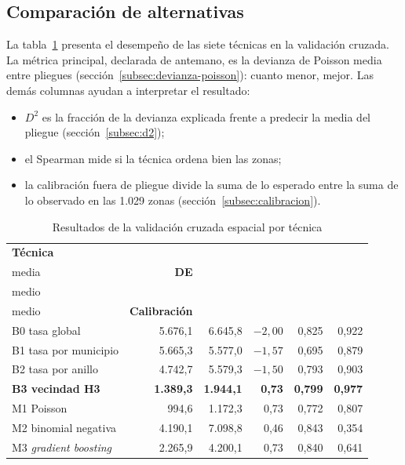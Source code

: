 \subsection{Comparación de alternativas}
\label{sec:comparacion-alternativas}

La tabla~\ref{tab:cv-resumen} presenta el desempeño de las siete técnicas en la validación
cruzada. La métrica principal, declarada de antemano, es la devianza de Poisson media entre
pliegues (sección~\ref{subsec:devianza-poisson}): cuanto menor, mejor. Las demás columnas
ayudan a interpretar el resultado:
\begin{itemize}
  \item $D^2$ es la fracción de la devianza explicada frente a predecir la media del
        pliegue (sección~\ref{subsec:d2});
  \item el Spearman mide si la técnica ordena bien las zonas;
  \item la calibración fuera de pliegue divide la suma de lo esperado entre la suma de lo
        observado en las 1.029 zonas (sección~\ref{subsec:calibracion}).
\end{itemize}

\begin{table}[H]
  \centering
  \caption{Resultados de la validación cruzada espacial por técnica}
  \label{tab:cv-resumen}
  \interlineadoSimple
  \small
  \begin{tabular}{@{}lrrrrr@{}}
    \toprule
    \textbf{Técnica} & \textbf{\celda{Devianza\\media}} & \textbf{DE} & \textbf{\celda{$D^2$\\medio}} & \textbf{\celda{Spearman\\medio}} & \textbf{Calibración} \\
    \midrule
    B0 tasa global & 5.676,1 & 6.645,8 & $-2{,}00$ & 0,825 & 0,922 \\
    B1 tasa por municipio & 5.665,3 & 5.577,0 & $-1{,}57$ & 0,695 & 0,879 \\
    B2 tasa por anillo & 4.742,7 & 5.579,3 & $-1{,}50$ & 0,793 & 0,903 \\
    \textbf{B3 vecindad H3} & \textbf{1.389,3} & \textbf{1.944,1} & \textbf{0,73} & \textbf{0,799} & \textbf{0,977} \\
    M1 Poisson & 994,6 & 1.172,3 & 0,73 & 0,772 & 0,807 \\
    M2 binomial negativa & 4.190,1 & 7.098,8 & 0,46 & 0,843 & 0,354 \\
    M3 \emph{gradient boosting} & 2.265,9 & 4.200,1 & 0,73 & 0,840 & 0,641 \\
    \bottomrule
  \end{tabular}
\end{table}

